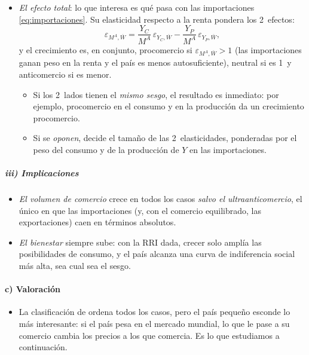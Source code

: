 \documentclass[11pt]{article}
\begin{document}
\begin{itemize}
\item \emph{El efecto total}: lo que interesa es qué pasa con las importaciones \eqref{eq:importaciones}. Su elasticidad respecto a la renta pondera los 2~efectos:
  \begin{equation}\label{eq:elasticidad-importaciones}
  \varepsilon_{M^A,\overline W}=\frac{Y_C}{M^A}\,\varepsilon_{Y_C,\overline W}-\frac{Y_P}{M^A}\,\varepsilon_{Y_P,\overline W},
  \end{equation}
  y el crecimiento es, en conjunto, procomercio si $\varepsilon_{M^A,\overline W}>1$ (las importaciones ganan peso en la renta y el país es menos autosuficiente), neutral si es 1~y anticomercio si es menor.
  \begin{itemize}
  \item Si los 2~lados tienen el \emph{mismo sesgo}, el resultado es inmediato: por ejemplo, procomercio en el consumo y en la producción da un crecimiento procomercio.
  \item Si se \emph{oponen}, decide el tamaño de las 2~elasticidades, ponderadas por el peso del consumo y de la producción de $Y$ en las importaciones.
  \end{itemize}
\end{itemize}

\subparagraph{iii) Implicaciones}

\begin{itemize}
\item \emph{El volumen de comercio} crece en todos los casos \emph{salvo el ultraanticomercio}, el único en que las importaciones (y, con el comercio equilibrado, las exportaciones) caen en términos absolutos.
\item \emph{El bienestar} siempre sube: con la RRI dada, crecer solo amplía las posibilidades de consumo, y el país alcanza una curva de indiferencia social más alta, sea cual sea el sesgo.
\end{itemize}

\paragraph{c) Valoración}

\begin{itemize}
\item La clasificación de  ordena todos los casos, pero el país pequeño esconde lo más interesante: si el país pesa en el mercado mundial, lo que le pase a su comercio cambia los precios a los que comercia. Es lo que estudiamos a continuación.
\end{itemize}
\end{document}
